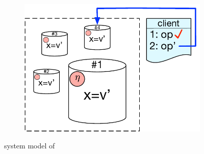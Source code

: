 \begin{figure}[b]
\begin{subfigure}[t]{0.3\textwidth}
        \centering
	\includegraphics[scale=0.32]{Figures/system_model3.pdf}
        \label{fig:sys_model3}
    \end{subfigure}
    \caption{system model of \tool}\label{fig:system_model}
\end{figure}
